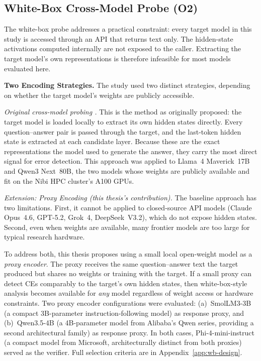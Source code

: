 \documentclass[12pt,twocolumn]{article}
\begin{document}
\subsection{White-Box Cross-Model Probe (O2)}
\label{sec:method-wb}

The white-box probe addresses a practical constraint: every target
model in this study is accessed through an API that returns text
only. The hidden-state activations computed internally are not
exposed to the caller. Extracting the target model's own
representations is therefore infeasible for most models evaluated
here.

\textbf{Two Encoding Strategies.}
The study used two distinct strategies, depending on whether the
target model's weights are publicly accessible.

\textit{Original cross-model probing \citep{tan2025consistent}.}
This is the method as originally proposed: the target model is loaded
locally to extract its own hidden states directly. Every
question--answer pair is passed through the target, and the
last-token hidden state is extracted at each candidate layer.
Because these are the exact representations the model used to
generate the answer, they carry the most direct signal for error
detection. This approach was applied to Llama~4 Maverick~17B and
Qwen3 Next~80B, the two models whose weights are publicly available
and fit on the Nibi HPC cluster's A100 GPUs.

\textit{Extension: Proxy Encoding (this thesis's contribution).}
The baseline approach has two limitations. First, it cannot be
applied to closed-source API models (Claude Opus~4.6, GPT-5.2,
Grok~4, DeepSeek~V3.2), which do not expose hidden states. Second,
even when weights are available, many frontier models are too large
for typical research hardware.

To address both, this thesis proposes using a small local
open-weight model as a \emph{proxy encoder}. The proxy receives the
same question--answer text the target produced but shares no weights
or training with the target. If a small proxy can detect CEs
comparably to the target's own hidden states, then white-box-style
analysis becomes available for \emph{any} model regardless of
weight access or hardware constraints.
Two proxy encoder configurations were evaluated:
(a)~SmolLM3-3B (a compact 3B-parameter instruction-following model)
as response proxy, and (b)~Qwen3.5-4B (a 4B-parameter model from
Alibaba's Qwen series, providing a second architectural family) as
response proxy. In both cases, Phi-4-mini-instruct (a compact model
from Microsoft, architecturally distinct from both proxies) served
as the verifier. Full selection criteria are in
Appendix~\ref{app:wb-design}.
\end{document}
